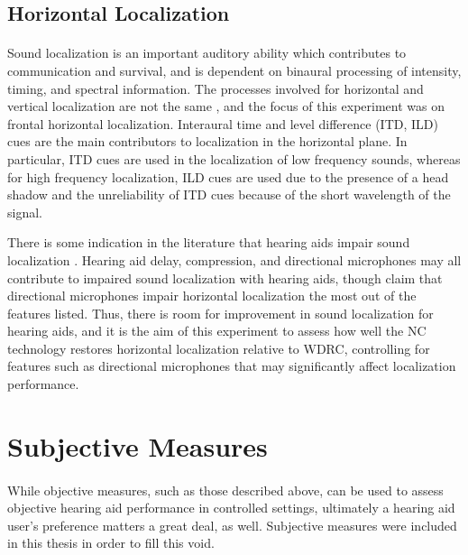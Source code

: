 \subsection{Horizontal Localization}
\paragraph{}Sound localization is an important auditory ability which contributes to communication \cite{Bronkhorst1988} and survival, and is dependent on binaural processing of intensity, timing, and spectral information.  The processes involved for horizontal and vertical localization are not the same \cite{Middlebrooks1991}, and the focus of this experiment was on frontal horizontal localization.  Interaural time and level difference (ITD, ILD) cues are the main contributors to localization in the horizontal plane.  In particular, ITD cues are used in the localization of low frequency sounds, whereas for high frequency localization, ILD cues are used due to the presence of a head shadow and the unreliability of ITD cues because of the short wavelength of the signal.

There is some indication in the literature that hearing aids impair sound localization \cite{Noble1990, VandenBogaert2006, Keidser2006}.  Hearing aid delay, compression, and directional microphones may all contribute to impaired sound localization with hearing aids, though  claim that directional microphones impair horizontal localization the most out of the features listed.  Thus, there is room for improvement in sound localization for hearing aids, and it is the aim of this experiment to assess how well the NC technology restores horizontal localization relative to WDRC, controlling for features such as directional microphones that may significantly affect localization performance.

\section{Subjective Measures}
\paragraph{}While objective measures, such as those described above, can be used to assess objective hearing aid performance in controlled settings, ultimately a hearing aid user's preference matters a great deal, as well.  Subjective measures were included in this thesis in order to fill this void.

